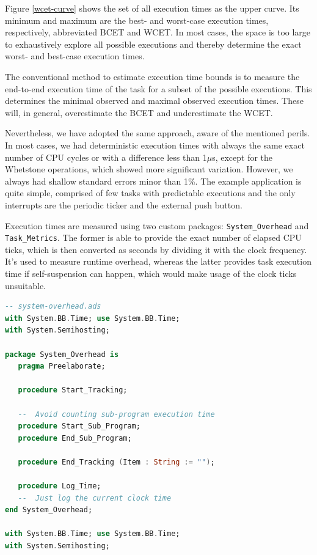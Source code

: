 \documentclass{article}
\begin{document}
Figure \ref{wcet-curve} shows the set of all execution times as the upper curve. Its minimum and maximum are the best- and worst-case execution times, respectively, abbreviated BCET and WCET. In most cases, the space is too large to exhaustively explore all possible executions and thereby determine the exact worst- and best-case execution times.

The conventional method to estimate execution time bounds is to measure the end-to-end execution time of the task for a subset of the possible executions. This determines the minimal observed and maximal observed execution times. These will, in general, overestimate the BCET and underestimate the WCET.

Nevertheless, we have adopted the same approach, aware of the mentioned perils. In most cases, we had deterministic execution times with always the same exact number of CPU cycles or with a difference less than 1$\mu$s, except for the Whetstone operations, which showed more significant variation. However, we always had shallow standard errors minor than 1\%. The example application is quite simple, comprised of few tasks with predictable executions and the only interrupts are the periodic ticker and the external push button.

Execution times are measured using two custom packages: \texttt{System\_Overhead} and \texttt{Task\_Metrics}. The former is able to provide the exact number of elapsed CPU ticks, which is then converted as seconds by dividing it with the clock frequency. It's used to measure runtime overhead, whereas the latter provides task execution time if self-suspension can happen, which would make usage of the clock ticks unsuitable.

\begin{lstlisting}[language=Ada]
-- system-overhead.ads
with System.BB.Time; use System.BB.Time;
with System.Semihosting;

package System_Overhead is
   pragma Preelaborate;

   procedure Start_Tracking;

   --  Avoid counting sub-program execution time
   procedure Start_Sub_Program;
   procedure End_Sub_Program;

   procedure End_Tracking (Item : String := "");

   procedure Log_Time;
   --  Just log the current clock time
end System_Overhead;

with System.BB.Time; use System.BB.Time;
with System.Semihosting;
\end{lstlisting}
\end{document}
